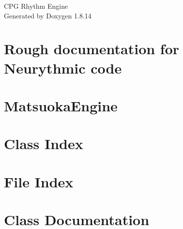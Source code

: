 \documentclass[twoside]{book}
\newcommand{\+}{\discretionary{\mbox{\scriptsize$\hookleftarrow$}}{}{}}
\newcommand{\clearemptydoublepage}{%
  \newpage{\pagestyle{empty}\cleardoublepage}%
}
\begin{document}
\hypersetup{pageanchor=false,
             bookmarksnumbered=true,
             pdfencoding=unicode
            }
\begin{titlepage}
\vspace*{7cm}
\begin{center}%
{\Large C\+PG Rhythm Engine }\\
\vspace*{1cm}
{\large Generated by Doxygen 1.8.14}\\
\end{center}
\end{titlepage}
\clearemptydoublepage
{}
\tableofcontents
\clearemptydoublepage
{}
\hypersetup{pageanchor=true}

\chapter{Rough documentation for Neurythmic code}
\label{index}\hypertarget{index}{}
\chapter{Matsuoka\+Engine}
\label{md_O_1_Documents_Max_7_Packages_max_cpg_source_MatsuokaEngine_src_ReadMe}

\chapter{Class Index}

\chapter{File Index}

\chapter{Class Documentation}
















\end{document}
